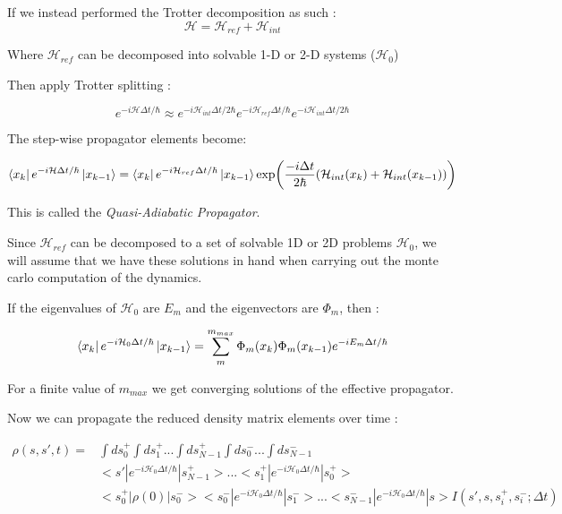 
 If we instead performed the Trotter decomposition as such : 
 \begin{equation}
\mathcal{H} = \mathcal{H}_{ref} + \mathcal{H}_{int}
 \end{equation}

Where $\mathcal{H}_{ref}$ can be decomposed into solvable 1-D or 2-D systems ($\mathcal{H}_0$) 

Then apply Trotter splitting : 

\begin{equation}
e^{-i \mathcal{H} \Delta t /\hbar} \approx e^{-i\mathcal{H}_{int}\Delta t / 2\hbar}e^{-i\mathcal{H}_{ref}\Delta t / \hbar}e^{-i\mathcal{H}_{int}\Delta t / 2\hbar}
\end{equation}

The step-wise propagator elements become:

\begin{equation}
\bra{x_k}e^{-i \mathcal{H} \Delta t / \hbar} \ket{x_{k-1}} = \bra{x_k}e^{-i \mathcal{H}_{ref} \Delta t / \hbar}\ket{x_{k-1}}  \exp(\frac{-i \Delta t}{2 \hbar}(\mathcal{H}_{int}(x_k) + \mathcal{H}_{int}(x_{k-1})))
\end{equation}

This is called the \emph{Quasi-Adiabatic Propagator}.

Since $\mathcal{H}_{ref}$ can be decomposed to a set of solvable 1D or 2D problems $\mathcal{H}_0$, we will assume that we have these solutions in hand when carrying out the monte carlo computation of the dynamics.


If the eigenvalues of $\mathcal{H}_0$ are $E_m$ and the eigenvectors are $\Phi_m$, then :

\begin{equation}
\bra{x_k}e^{-i \mathcal{H}_{0} \Delta t / \hbar}\ket{x_{k-1}} = \sum_{m}^{m_{max}} \Phi_m (x_k) \Phi_m(x_{k-1}) e^{-iE_{m}\Delta t / \hbar}
\end{equation}

For a finite value of $m_{max}$ we get converging solutions of the effective propagator.

Now we can propagate the reduced density matrix elements over time :

\begin{equation}
\begin{split}
\rho(s, s', t) = & \int ds_0^{+} \int ds_1^{+} ... \int ds_{N-1}^{+} \int ds_{0}^{-} ... \int ds_{N-1}^{-} \\ &  <s'|e^{-i \mathscr{H}_{0} \Delta t / \hbar}|s_{N-1}^{+}> ... <s_1^{+}|e^{-i \mathscr{H}_{0} \Delta t / \hbar}|s_0^{+}> \\ & <s_0^{+}|\rho(0)|s_0^{-}> <s_0^{-}|e^{-i \mathscr{H}_{0} \Delta t / \hbar}|s_1^{-}> ...<s_{N-1}^{-}|e^{-i \mathscr{H}_{0} \Delta t / \hbar}|s>I(s', s, s_i^{+}, s_i^{-} ; \Delta t)
\end{split}
\end{equation}

